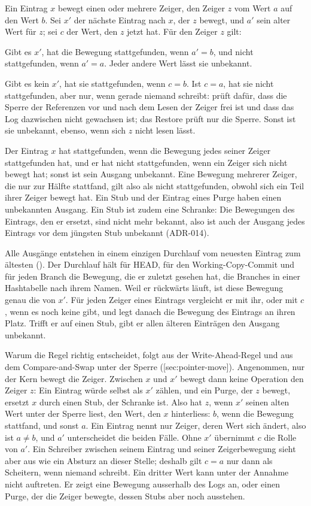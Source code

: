 {Ein Eintrag $x$ bewegt einen oder mehrere Zeiger, den Zeiger $z$ vom Wert $a$ auf den Wert $b$.
Sei $x'$ der nächste Eintrag nach $x$, der $z$ bewegt, und $a'$ sein alter Wert für $z$;
sei $c$ der Wert, den $z$ jetzt hat.
Für den Zeiger $z$ gilt:

\startitemize
\item Gibt es $x'$, hat die Bewegung stattgefunden, wenn $a' = b$,
und nicht stattgefunden, wenn $a' = a$. Jeder andere Wert lässt sie unbekannt.
\item Gibt es kein $x'$, hat sie stattgefunden, wenn $c = b$.
Ist $c = a$, hat sie nicht stattgefunden, aber nur, wenn gerade niemand schreibt:
 prüft dafür, dass die Sperre der Referenzen vor und nach dem Lesen der Zeiger
frei ist und dass das Log dazwischen nicht gewachsen ist;
das Restore prüft nur die Sperre.
Sonst ist sie unbekannt, ebenso, wenn sich $z$ nicht lesen lässt.
\stopitemize

Der Eintrag $x$ hat stattgefunden, wenn die Bewegung jedes seiner Zeiger stattgefunden hat,
und er hat nicht stattgefunden, wenn ein Zeiger sich nicht bewegt hat;
sonst ist sein Ausgang unbekannt.
Eine Bewegung mehrerer Zeiger, die nur zur Hälfte stattfand, gilt also als nicht stattgefunden,
obwohl sich ein Teil ihrer Zeiger bewegt hat.
Ein Stub und der Eintrag eines Purge haben einen unbekannten Ausgang.
Ein Stub ist zudem eine Schranke:
Die Bewegungen des Eintrags, den er ersetzt, sind nicht mehr bekannt,
also ist auch der Ausgang jedes Eintrags vor dem jüngsten Stub unbekannt (ADR-014).

Alle Ausgänge entstehen in einem einzigen Durchlauf vom neuesten Eintrag zum ältesten
().
Der Durchlauf hält für HEAD, für den Working-Copy-Commit und für jeden Branch
die Bewegung, die er zuletzt gesehen hat, die Branches in einer Hashtabelle nach ihrem Namen.
Weil er rückwärts läuft, ist diese Bewegung genau die von $x'$.
Für jeden Zeiger eines Eintrags vergleicht er mit ihr, oder mit $c$, wenn es noch keine gibt,
und legt danach die Bewegung des Eintrags an ihren Platz.
Trifft er auf einen Stub, gibt er allen älteren Einträgen den Ausgang unbekannt.

Warum die Regel richtig entscheidet, folgt aus der Write-Ahead-Regel
und aus dem Compare-and-Swap unter der Sperre ([sec:pointer-move]).
Angenommen, nur der Kern bewegt die Zeiger.
Zwischen $x$ und $x'$ bewegt dann keine Operation den Zeiger $z$:
Ein Eintrag würde selbst als $x'$ zählen,
und ein Purge, der $z$ bewegt, ersetzt $x$ durch einen Stub, der Schranke ist.
Also hat $z$, wenn $x'$ seinen alten Wert unter der Sperre liest,
den Wert, den $x$ hinterliess: $b$, wenn die Bewegung stattfand, und sonst $a$.
Ein Eintrag nennt nur Zeiger, deren Wert sich ändert, also ist $a \ne b$,
und $a'$ unterscheidet die beiden Fälle.
Ohne $x'$ übernimmt $c$ die Rolle von $a'$.
Ein Schreiber zwischen seinem Eintrag und seiner Zeigerbewegung sieht aber aus
wie ein Absturz an dieser Stelle;
deshalb gilt $c = a$ nur dann als Scheitern, wenn niemand schreibt.
Ein dritter Wert kann unter der Annahme nicht auftreten.
Er zeigt eine Bewegung ausserhalb des Logs an,
oder einen Purge, der die Zeiger bewegte, dessen Stubs aber noch ausstehen.

}
